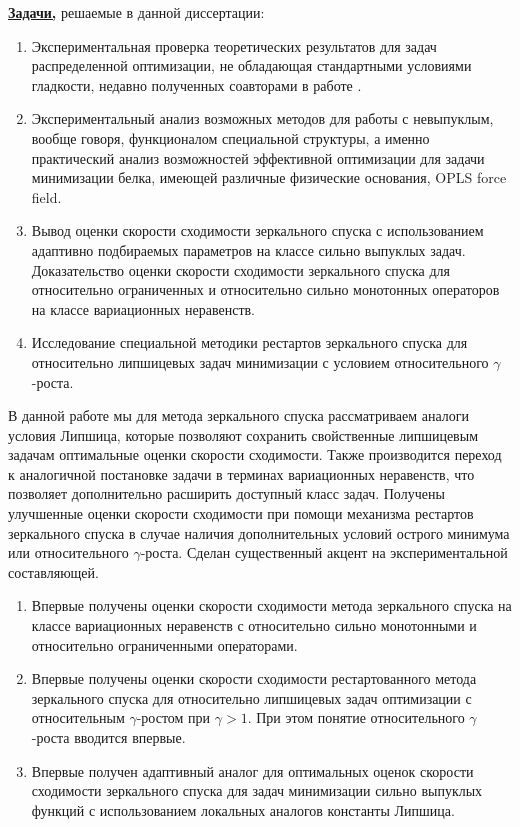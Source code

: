{\underline{\textbf{Задачи,}}} решаемые в данной диссертации:
\begin{enumerate}
    \item Экспериментальная проверка теоретических результатов для задач распределенной оптимизации, не обладающая стандартными условиями гладкости, недавно полученных соавторами в работе \cite{GorbunovKMR20}.
    \item Экспериментальный анализ возможных методов для работы с невыпуклым, вообще говоря, функционалом специальной структуры, а именно практический анализ возможностей эффективной оптимизации для задачи минимизации белка, имеющей различные физические основания,  OPLS force field. 
    \item Вывод оценки скорости сходимости зеркального спуска с использованием адаптивно подбираемых параметров на классе сильно выпуклых задач. Доказательство оценки скорости сходимости зеркального спуска для относительно ограниченных и относительно сильно монотонных операторов на классе вариационных неравенств.
    \item Исследование специальной методики рестартов зеркального спуска для относительно липшицевых задач минимизации с условием относительного $\gamma$-роста. 
\end{enumerate}
В данной работе мы для метода зеркального спуска рассматриваем аналоги условия Липшица, которые позволяют сохранить свойственные липшицевым задачам оптимальные оценки скорости сходимости. Также производится переход к аналогичной постановке задачи в терминах вариационных неравенств, что позволяет дополнительно расширить доступный класс задач. Получены улучшенные оценки скорости сходимости при помощи механизма рестартов зеркального спуска в случае наличия дополнительных условий острого минимума или относительного $\gamma$-роста. Сделан существенный акцент на экспериментальной составляющей.

{\novelty}
\begin{enumerate}[beginpenalty=10000] %
  \item Впервые получены оценки скорости сходимости метода зеркального спуска на классе вариационных неравенств с относительно сильно монотонными и относительно ограниченными операторами.
  \item Впервые получены оценки скорости сходимости рестартованного метода зеркального спуска для относительно липшицевых задач оптимизации с относительным $\gamma$-ростом при $\gamma > 1$. При этом понятие относительного $\gamma$-роста вводится впервые. 
  \item Впервые получен адаптивный аналог для оптимальных оценок скорости сходимости зеркального спуска для задач минимизации сильно выпуклых функций с использованием локальных аналогов константы Липшица.
\end{enumerate}

